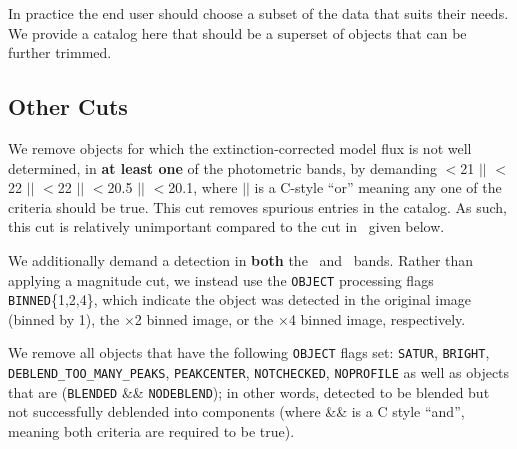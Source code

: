 \documentclass[12pt,preprint]{aastex}
\begin{document}
In practice the end user should choose a subset of the data that suits their
needs.  We provide a catalog here that should be a superset of objects that can
be further trimmed.

\subsection{Other Cuts}

We remove objects for which the extinction-corrected \citep{Schlegel98} model
flux is not well determined, in {\bf at least one} of the photometric bands, by
demanding \umag$ < $21 $||$ \gmag$ < $22 $||$ \rmag$ < $22 $||$ \imag$ < $20.5
$||$ \zmag$ < $20.1, where $||$ is a C-style ``or'' meaning any one of the
criteria should be true. This cut removes spurious entries in the catalog.  As
such, this cut is relatively unimportant compared to the cut in \rmag\ given
below.

We additionally demand a detection in {\bf both} the \rmag\ and \imag\ bands.
Rather than applying a magnitude cut, we instead use the \texttt{OBJECT}
processing flags \texttt{BINNED}\{1,2,4\}, which indicate the object was
detected in the original image (binned by 1), the $\times$2 binned image, or
the $\times$4 binned image, respectively\citep{Stough02}.

\begin{sloppypar}
We remove all objects that have the following \texttt{OBJECT} flags set:
\texttt{SATUR}, \texttt{BRIGHT}, \texttt{DEBLEND\_TOO\_MANY\_PEAKS},
\texttt{PEAKCENTER}, \texttt{NOTCHECKED}, \texttt{NOPROFILE} as well as objects
that are (\texttt{BLENDED} \&\& \texttt{NODEBLEND}); in other words, detected
to be blended but not successfully deblended into components (where \&\& is
a C style ``and'', meaning both criteria are required to be true). 
\end{sloppypar}

\end{document}
